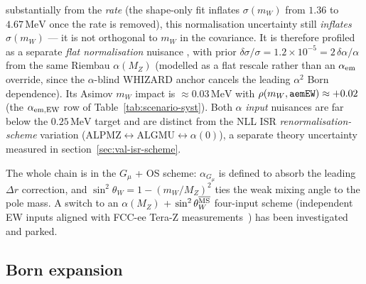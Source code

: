 \documentclass[11pt,a4paper]{article}
\newcommand{\code}[1]{\texttt{\detokenize{#1}}}
\newcommand{\mW}{m_W}
\newcommand{\MeV}{\ensuremath{\,\mathrm{MeV}}}
\begin{document}
substantially from the \emph{rate} (the shape-only fit inflates $\sigma(\mW)$
from $1.36$ to $4.67\MeV$ once the rate is removed), this normalisation
uncertainty still \emph{inflates} $\sigma(\mW)$ --- it is not orthogonal to
$\mW$ in the covariance. It is therefore profiled as a separate \emph{flat
normalisation} nuisance \code{aemEW}, with prior $\delta\sigma/\sigma =
1.2\times 10^{-5} = 2\,\delta\alpha/\alpha$ from the same Riembau $\alpha(M_Z)$
(modelled as a flat rescale rather than an $\alpha_{\rm em}$ override, since the
$\alpha$-blind WHIZARD anchor cancels the leading $\alpha^2$ Born dependence).
Its Asimov $\mW$ impact is $\approx0.03\MeV$ with $\rho(\mW,\code{aemEW})\approx
+0.02$ (the $\alpha_{\rm em,EW}$ row of Table~\ref{tab:scenario-syst}). Both
$\alpha$ \emph{input} nuisances are far below the $0.25\MeV$ target and are
distinct from the NLL ISR \emph{renormalisation-scheme} variation
(ALPMZ$\leftrightarrow$ALGMU$\leftrightarrow\alpha(0)$), a separate theory
uncertainty measured in section~\ref{sec:val-isr-scheme}.

The whole chain is in the $G_\mu$ + OS scheme: $\alpha_{G_\mu}$ is
defined to absorb the leading $\Delta r$ correction, and
$\sin^2\theta_W = 1-(\mW/M_Z)^2$ ties the weak mixing angle to the
pole mass. A switch to an $\alpha(M_Z)$ + $\sin^2\theta_W^{\overline{\rm MS}}$
four-input scheme (independent EW inputs aligned with FCC-ee
Tera-Z measurements~\cite{RiembauTeraZ}) has been investigated and
parked.

\subsection{Born expansion}\label{sec:born}
\end{document}
